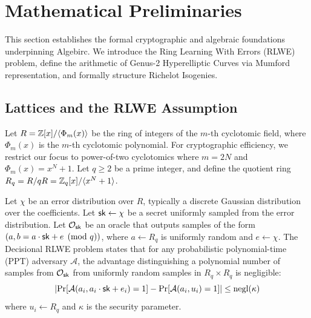 \section{Mathematical Preliminaries}
\label{sec:preliminaries}

This section establishes the formal cryptographic and algebraic foundations underpinning Algebirc. We introduce the Ring Learning With Errors (RLWE) problem, define the arithmetic of Genus-2 Hyperelliptic Curves via Mumford representation, and formally structure Richelot Isogenies.

\subsection{Lattices and the RLWE Assumption}
Let $R = \mathbb{Z}[x]/\langle \Phi_m(x) \rangle$ be the ring of integers of the $m$-th cyclotomic field, where $\Phi_m(x)$ is the $m$-th cyclotomic polynomial. For cryptographic efficiency, we restrict our focus to power-of-two cyclotomics where $m = 2N$ and $\Phi_m(x) = x^N + 1$. 
Let $q \ge 2$ be a prime integer, and define the quotient ring $R_q = R / qR = \mathbb{Z}_q[x]/\langle x^N + 1 \rangle$.

\begin{definition}
Let $\chi$ be an error distribution over $R$, typically a discrete Gaussian distribution over the coefficients. Let $\mathsf{sk} \leftarrow \chi$ be a secret uniformly sampled from the error distribution. Let $\mathcal{O}_{\mathsf{sk}}$ be an oracle that outputs samples of the form $(a, b = a \cdot \mathsf{sk} + e \pmod q)$, where $a \leftarrow R_q$ is uniformly random and $e \leftarrow \chi$.
The Decisional RLWE problem states that for any probabilistic polynomial-time (PPT) adversary $\mathcal{A}$, the advantage distinguishing a polynomial number of samples from $\mathcal{O}_{\mathsf{sk}}$ from uniformly random samples in $R_q \times R_q$ is negligible:
\begin{equation}
    \left| \Pr[\mathcal{A}(a_i, a_i \cdot \mathsf{sk} + e_i) = 1] - \Pr[\mathcal{A}(a_i, u_i) = 1] \right| \le \text{negl}(\kappa)
\end{equation}
where $u_i \leftarrow R_q$ and $\kappa$ is the security parameter.
\end{definition}

